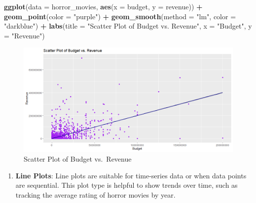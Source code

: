 \documentclass[
]{book}
\newenvironment{Shaded}{\begin{snugshade}}{\end{snugshade}}
\newcommand{\AttributeTok}[1]{\textcolor[rgb]{0.13,0.29,0.53}{#1}}
\newcommand{\FunctionTok}[1]{\textcolor[rgb]{0.13,0.29,0.53}{\textbf{#1}}}
\newcommand{\NormalTok}[1]{#1}
\newcommand{\SpecialCharTok}[1]{\textcolor[rgb]{0.81,0.36,0.00}{\textbf{#1}}}
\newcommand{\StringTok}[1]{\textcolor[rgb]{0.31,0.60,0.02}{#1}}
\providecommand{\tightlist}{%
  \setlength{\itemsep}{0pt}\setlength{\parskip}{0pt}}
\begin{document}
\begin{Shaded}
\begin{Highlighting}[]
\FunctionTok{ggplot}\NormalTok{(}\AttributeTok{data =}\NormalTok{ horror\_movies, }\FunctionTok{aes}\NormalTok{(}\AttributeTok{x =}\NormalTok{ budget, }\AttributeTok{y =}\NormalTok{ revenue)) }\SpecialCharTok{+}
  \FunctionTok{geom\_point}\NormalTok{(}\AttributeTok{color =} \StringTok{"purple"}\NormalTok{) }\SpecialCharTok{+}
  \FunctionTok{geom\_smooth}\NormalTok{(}\AttributeTok{method =} \StringTok{"lm"}\NormalTok{, }\AttributeTok{color =} \StringTok{"darkblue"}\NormalTok{) }\SpecialCharTok{+}
  \FunctionTok{labs}\NormalTok{(}\AttributeTok{title =} \StringTok{"Scatter Plot of Budget vs. Revenue"}\NormalTok{, }\AttributeTok{x =} \StringTok{"Budget"}\NormalTok{, }\AttributeTok{y =} \StringTok{"Revenue"}\NormalTok{)}
\end{Highlighting}
\end{Shaded}

\begin{figure}
\centering
\includegraphics[width=1\textwidth,height=\textheight]{images/scatter_plot.png}
\caption{Scatter Plot of Budget vs.~Revenue}
\end{figure}

\begin{enumerate}
\def\labelenumi{\arabic{enumi}.}
\setcounter{enumi}{1}
\tightlist
\item
  \textbf{Line Plots}: Line plots are suitable for time-series data or when data points are sequential. This plot type is helpful to show trends over time, such as tracking the average rating of horror movies by year.
\end{enumerate}
\end{document}
